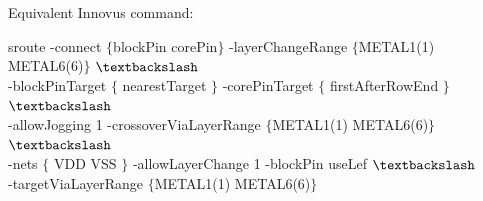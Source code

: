 			\vspace{24mm}
Equivalent Innovus command:
\begin{codeline}
sroute -connect $\{$blockPin corePin$\}$ -layerChangeRange $\{$METAL1(1) METAL6(6)$\}$ $\textbackslash$ \\-blockPinTarget $\{$ nearestTarget $\}$ -corePinTarget $\{$ firstAfterRowEnd $\}$ $\textbackslash$\\ -allowJogging 1 -crossoverViaLayerRange $\{$METAL1(1) METAL6(6)$\}$ $\textbackslash$ \\-nets $\{$ VDD VSS $\}$ -allowLayerChange 1 -blockPin useLef $\textbackslash$ \\-targetViaLayerRange $\{$METAL1(1) METAL6(6)$\}$
\end{codeline}



